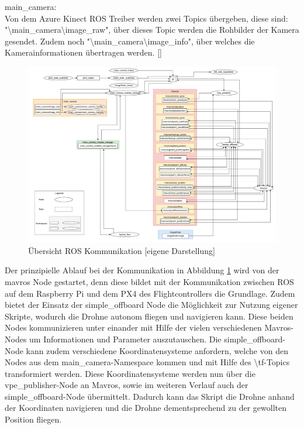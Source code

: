main\_camera: \\
Von dem Azure Kinect ROS Treiber werden zwei Topics übergeben, diese sind: \\
"\textbackslash main\_camera\textbackslash image\_raw", über dieses Topic werden die Rohbilder der Kamera gesendet. Zudem noch "\textbackslash main\_camera\textbackslash image\_info", über welches die Kamerainformationen übertragen werden. []\\

    \begin{landscape}
        \begin{figure}
            \includegraphics[width=\paperwidth,keepaspectratio]{images/graph_ros.pdf}
            \caption[Übersicht ROS Kommunikation]{\label{img ros_communication} Übersicht ROS Kommunikation [eigene Darstellung]}
        \end{figure}
    \end{landscape}


Der prinzipielle Ablauf bei der Kommunikation in Abbildung \ref{img ros_communication} wird von der mavros Node gestartet, denn diese bildet mit der Kommunikation zwischen ROS auf dem Raspberry Pi und dem PX4 des Flightcontrollers die Grundlage. Zudem bietet der Einsatz der simple\_offboard Node die Möglichkeit zur Nutzung eigener Skripte, wodurch die Drohne autonom fliegen und navigieren kann. Diese beiden Nodes kommunizieren unter einander mit Hilfe der vielen verschiedenen Mavros-Nodes um Informationen und Parameter auszutauschen. Die simple\_offboard-Node kann zudem verschiedene Koordinatensysteme anfordern, welche von den Nodes aus dem main\_camera-Namespace kommen und mit Hilfe des \textbackslash tf-Topics transformiert werden. Diese Koordinatensysteme werden nun über die vpe\_publisher-Node an Mavros, sowie im weiteren Verlauf auch der simple\_offboard-Node übermittelt. Dadurch kann das Skript die Drohne anhand der Koordinaten navigieren und die Drohne dementsprechend zu der gewollten Position fliegen.
 

